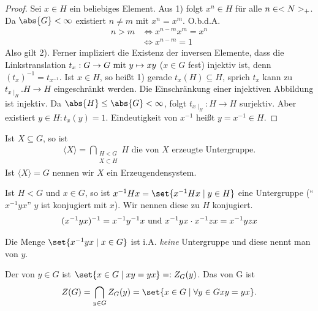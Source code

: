 \begin{proof}
	Sei $x \in H$ ein beliebiges Element. Aus 1) folgt $x^n \in H$ für alle $n \in \N_{+}$. Da $\abs{G}< \infty$ existiert $n\neq m$ mit $x^n = x^m$. O.b.d.A.
	\begin{align*}
		 n > m &\Longleftrightarrow x^{n-m} x^m = x^n\\
		 &\Longleftrightarrow x^{n-m} = 1
	\end{align*}
	Also gilt 2). Ferner impliziert die Existenz der inversen Elemente, dass die Linkstranslation $t_x: G \to G \mit y \mapsto xy$ ($x \in G$ fest) injektiv ist, denn $(t_x)^{-1} = t_{x^{-1}}$. Ist $x \in H$, so heißt 1) gerade $t_x(H) \subseteq H$, sprich $t_x$ kann zu $t_{x\mid_H}. H \to H$ eingeschränkt werden. Die Einschränkung einer injektiven Abbildung ist injektiv. Da $\abs{H} \le \abs{G} < \infty$, folgt $t_{x\mid_H}: H \to H$ surjektiv. Aber existiert $y \in H: t_x(y)= 1$. Eindeutigkeit von $x^{-1}$ heißt $y = x^{-1} \in H$.
\end{proof}
\begin{definition}[Erzeugendensystem]
	Ist $X \subseteq G$, so ist
	\begin{align*}
		\langle X \rangle = \bigcap_{\substack{H < G\\X \subset H}} H \text{ die von $X$ erzeugte Untergruppe}.
	\end{align*}
	Ist $\langle X \rangle = G$ nennen wir $X$ ein Erzeugendensystem.
\end{definition}
\begin{definition}[Konjugation]
	Ist $H < G$ und $x \in G$, so ist $x^{-1}Hx = \set{x^{-1}Hx\mid y \in H}$ eine Untergruppe (``$x^{-1}yx$'' $y$ ist konjugiert mit $x$). Wir nennen diese zu $H$ konjugiert.
	\begin{align*}
		(x^{-1}yx)^{-1} = x^{-1}y^{-1}x \und x^{-1}yx\cdot x^{-1}zx = x^{-1}yzx
	\end{align*}
\end{definition}
\begin{definition}[Konjugationsklasse]
	Die Menge $\set{x^{-1}yx \mid x \in G}$ ist i.A. \emph{keine} Untergruppe und diese nennt man  von $y$.
\end{definition}
\begin{definition}
	Der  von $y \in G$ ist $\set{x \in G \mid xy = yx} =: Z_G(y)$. Das  von G ist
	\begin{align*}
		Z(G) = \bigcap_{y \in G} Z_G(y) = \set{x \in G \mid \forall y \in G xy=yx}.
	\end{align*}
\end{definition}
